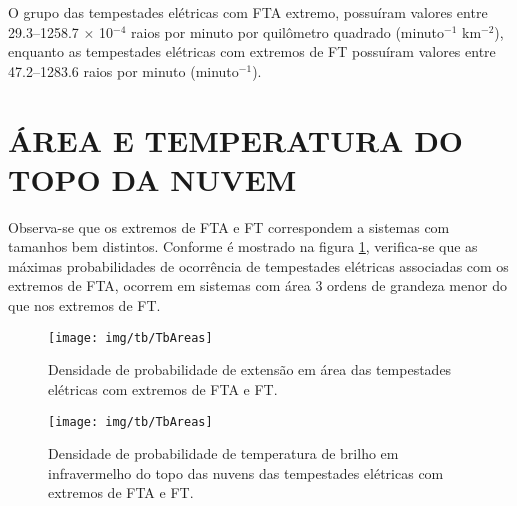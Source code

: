 O grupo das tempestades elétricas com FTA extremo, possuíram valores entre {29.3--1258.7 $\times$ 10$^{-4}$} raios por minuto por quilômetro quadrado (minuto$^{-1}$ km$^{-2}$), enquanto as tempestades elétricas com extremos de FT possuíram valores entre {47.2--1283.6} raios por minuto (minuto$^{-1}$). 





\section{ÁREA E TEMPERATURA DO TOPO DA NUVEM}

Observa-se que os extremos de FTA e FT correspondem a sistemas com tamanhos bem distintos. Conforme é mostrado na figura \ref{size}, verifica-se que as máximas probabilidades de ocorrência de tempestades elétricas associadas com os extremos de FTA, ocorrem em sistemas com área 3 ordens de grandeza menor do que nos extremos de FT.

\begin{figure}[!ht]
  \centering
  \texttt{[image: img/tb/TbAreas]}   
  \caption{Densidade de probabilidade de extensão em área das tempestades elétricas com extremos de FTA e FT.}
  \label{size}  
\end{figure}

\begin{figure}[!hb]
  \centering 
  \texttt{[image: img/tb/TbAreas]}
  \caption{Densidade de probabilidade de temperatura de brilho em infravermelho do topo das nuvens das tempestades elétricas com extremos de FTA e FT.}
  \label{tb}
\end{figure}


